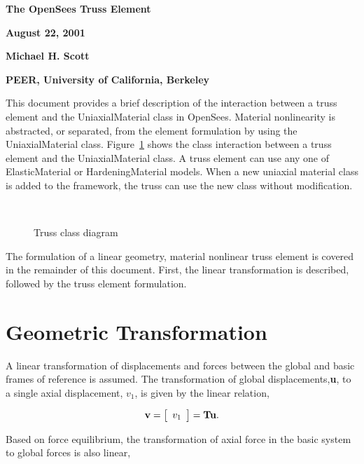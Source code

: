 \documentclass[12pt]{article}
\begin{document}
\newcommand{\pd}[2]{\frac{\partial{#1}}{\partial{#2}}}

\begin{center}
{\bf \Large The OpenSees Truss Element}

{\bf August 22, 2001} 

{\bf Michael H. Scott} 

{\bf PEER, University of California, Berkeley}
\end{center}

This document provides a brief description of the interaction between a truss
element and the UniaxialMaterial class in OpenSees.
Material nonlinearity is abstracted, or separated, from the
element formulation by using the UniaxialMaterial class.
Figure~\ref{fig:TrussClass} shows the class interaction between a truss
element and the UniaxialMaterial class. A truss element can use any one of
ElasticMaterial or HardeningMaterial models. When a new uniaxial material class
is added to the framework, the truss can use the new class without modification.

\begin{figure}[htpb]
\begin{center}
\leavevmode
\hbox{%
}
\end{center}
\caption{Truss class diagram}
\label{fig:TrussClass}
\end{figure}

The formulation of a linear geometry, material nonlinear truss element is covered
in the remainder of this document. First, the linear transformation is described,
followed by the truss element formulation.

\section{Geometric Transformation}
A linear transformation of displacements and forces between the global and basic
frames of reference is assumed. The transformation of global displacements,{\bf u},
to a single axial displacement, $v_1$, is given by the linear relation,

\begin{equation}
\label{eq:v=Tu}
{\bf v} = \left[ \begin{array}{c} v_1 \end{array} \right] = {\bf T}{\bf u}.
\end{equation}

\noindent Based on force equilibrium, the transformation of axial force in the
basic system to global forces is also linear,
\end{document}
